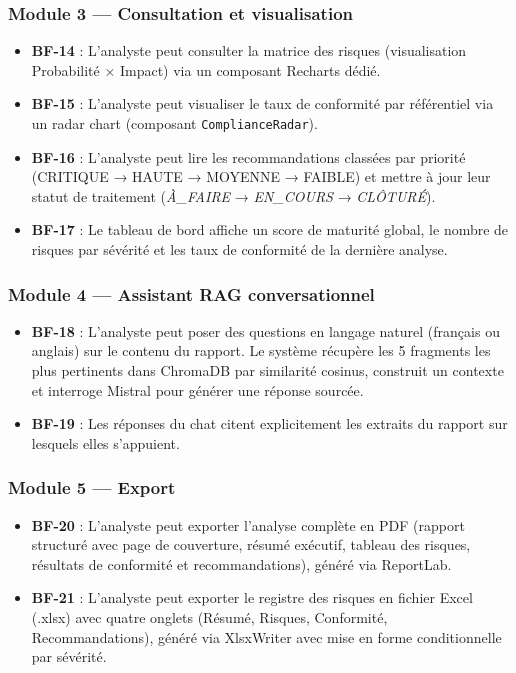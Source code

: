 \documentclass[a4paper,12pt,oneside]{report}
\begin{document}
	\subsubsection*{Module 3 — Consultation et visualisation}
	
	\begin{itemize}
		\item \textbf{BF-14} : L'analyste peut consulter la matrice des risques
		(visualisation Probabilité × Impact) via un composant Recharts dédié.
		\item \textbf{BF-15} : L'analyste peut visualiser le taux de conformité
		par référentiel via un radar chart (composant \texttt{ComplianceRadar}).
		\item \textbf{BF-16} : L'analyste peut lire les recommandations classées
		par priorité (CRITIQUE → HAUTE → MOYENNE → FAIBLE) et mettre à jour
		leur statut de traitement (\textit{À\_FAIRE} → \textit{EN\_COURS}
		→ \textit{CLÔTURÉ}).
		\item \textbf{BF-17} : Le tableau de bord affiche un score de maturité
		global, le nombre de risques par sévérité et les taux de conformité
		de la dernière analyse.
	\end{itemize}
	
	\subsubsection*{Module 4 — Assistant RAG conversationnel}
	
	\begin{itemize}
		\item \textbf{BF-18} : L'analyste peut poser des questions en langage
		naturel (français ou anglais) sur le contenu du rapport. Le système
		récupère les 5 fragments les plus pertinents dans ChromaDB par
		similarité cosinus, construit un contexte et interroge Mistral pour
		générer une réponse sourcée.
		\item \textbf{BF-19} : Les réponses du chat citent explicitement les
		extraits du rapport sur lesquels elles s'appuient.
	\end{itemize}
	
	\subsubsection*{Module 5 — Export}
	
	\begin{itemize}
		\item \textbf{BF-20} : L'analyste peut exporter l'analyse complète en
		PDF (rapport structuré avec page de couverture, résumé exécutif,
		tableau des risques, résultats de conformité et recommandations),
		généré via ReportLab.
		\item \textbf{BF-21} : L'analyste peut exporter le registre des risques
		en fichier Excel (.xlsx) avec quatre onglets (Résumé, Risques,
		Conformité, Recommandations), généré via XlsxWriter avec mise en
		forme conditionnelle par sévérité.
	\end{itemize}
	
\end{document}
